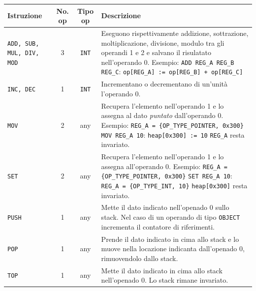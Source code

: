 \documentclass[a4paper, 11pt]{article}
\newcommand{\code}[1]{\scriptsize{\texttt{#1}}\normalsize}
\begin{document}
\begin{center}
\begin{tabular}{p{2.2 cm}|c|c|p{5.5 cm}}
\hline
\textbf{Istruzione} & \textbf{No. op} & \textbf{Tipo op} & \textbf{Descrizione}\\
\hline


\code{ADD, SUB, MUL, DIV, MOD} & 3 & \code{INT} & \footnotesize{Eseguono rispettivamente addizione, sottrazione, moltiplicazione, divisione, modulo tra gli operandi 1 e 2 e salvano il risulatato nell'operando 0. Esempio: \linebreak \code{ADD REG\_A REG\_B REG\_C}: \code{op[REG\_A] := op[REG\_B] + op[REG\_C]}}\\

\code{INC, DEC} & 1 & \code{INT} & \footnotesize{Incrementano o decrementano di un'unit\`a l'operando 0.}\\

\code{MOV} & 2 & any & \footnotesize{Recupera l'elemento nell'operando 1 e lo assegna al dato \emph{puntato} dall'operando 0. Esempio:} 
\linebreak \code{REG\_A = \{OP\_TYPE\_POINTER, 0x300\}} 
\linebreak \code{MOV REG\_A 10}: \code{heap[0x300] := 10} 
\linebreak \code{REG\_A} \footnotesize{resta invariato.}\\

\code{SET} & 2 & any & \footnotesize{Recupera l'elemento nell'operando 1 e lo assegna all'operando 0. Esempio:} \linebreak \code{REG\_A = \{OP\_TYPE\_POINTER, 0x300\}} \linebreak \code{SET REG\_A 10}: 
\linebreak \code{REG\_A = \{OP\_TYPE\_INT, 10\}} 
\linebreak \code{heap[0x300]}
\footnotesize{resta invariato.}\\

\code{PUSH} & 1 & any & \footnotesize{Mette il dato indicato nell'openado 0 sullo stack. Nel caso di un operando di tipo} \code{OBJECT} \footnotesize{incrementa il contatore di riferimenti.}\\

\code{POP} & 1 & any & \footnotesize{Prende il dato indicato in cima allo stack e lo muove nella locazione indicanta dall'openado 0, rimuovendolo dallo stack.}\\

\code{TOP} & 1 & any & \footnotesize{Mette il dato indicato in cima allo stack nell'openado 0. Lo stack rimane invariato.}\\


\end{tabular}
\end{center}
\end{document}
